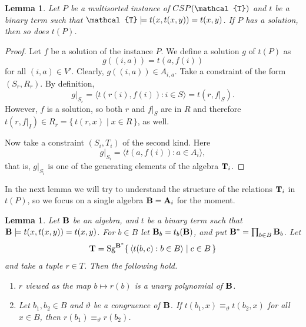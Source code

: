 \documentclass[11pt]{amsart}
\newcommand{\m}[1]{{\uppercase {\mathbf {#1}}}}
\newcommand{\vr}[1]{{\uppercase {\mathcal{#1}}}}
\newcommand{\Sg}{{\rm Sg}}
\newcommand{\lb}{\langle}
\newcommand{\rb}{\rangle}
\newtheorem{lm}[thm]{Lemma}
\theoremstyle{definition}
\begin{document}
\begin{lm}
\label{l:tA-solution}
Let $P$ be a multisorted instance of $CSP(\vr t)$ and $t$ be a binary term
such that $\vr t\models t(x,t(x,y)) = t(x,y)$.
If $P$ has a solution, then so does $t(P)$.
\end{lm}

\begin{proof}
Let $f$ be a solution of the instance $P$. We define a solution $g$ of $t(P)$ as 
\[ g((i,a)) = t(a,f(i)) \]
for all $(i,a)\in V'$. Clearly, $g((i,a))\in A_{i,a}$. Take a constraint of the form $(S_r,R_r)$. By definition, 
\[ g|_{S_r} = \lb t(r(i),f(i)) : i\in S \rb = t(r,f|_S). \]
However, $f$ is a solution, so both $r$ and $f|_S$ are in $R$ and therefore $t(r,f|_I)\in R_r=\{\,t(r,x)\mid x\in R\,\}$, as well.

Now take a constraint $(S_i,T_i)$ of the second kind. Here
\[ g|_{S_i} = \lb t(a,f(i)) : a\in A_i \rb, \]
that is, $g|_{S_i}$ is one of the generating elements of the algebra $\m t_i$.
\end{proof}

In the next lemma we will try to understand the structure of the relations $\m T_i$ in $t(P)$, so we focus on a single algebra $\m b=\m a_i$ for the moment.

\begin{lm}
\label{l:t-constraint}
Let $\m B$ be an algebra, and $t$ be a binary term such that $\m b\models t(x,t(x,y))=t(x,y)$. For $b\in B$ let $\m B_b = t_b(\m B)$, and put
$\m B^* = \prod_{b\in B}\m B_b$. Let 
\[ \m T = \Sg^{\m B^*} \{\, \lb t(b,c) : b\in B \rb \mid c\in B \,\} \]
and take a tuple $r\in T$. Then the following hold.
\begin{enumerate}
\item $r$ viewed as the map $b\mapsto r(b)$ is a unary polynomial of $\m B$.
\item Let $b_1,b_2\in B$ and $\vartheta$ be a congruence of $\m B$.
If $t(b_1,x) \equiv_\vartheta t(b_2,x)$ for all $x\in B$, then $r(b_1) \equiv_\vartheta r(b_2)$.
\end{enumerate}
\end{lm}
\end{document}
